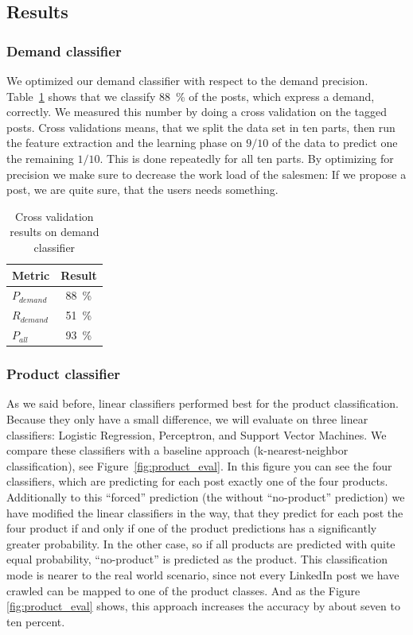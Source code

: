 \subsection{Results}
\label{sub:results}

\subsubsection{Demand classifier}
\label{ssub:demand_classifier}

We optimized our demand classifier with respect to the demand precision.
Table~\ref{table:demand_evaluation} shows that we classify 88~\% of the posts, which express a demand, correctly.
We measured this number by doing a cross validation on the tagged posts.
Cross validations means, that we split the data set in ten parts, then run the feature extraction and the learning phase on $9 / 10$ of the data to predict one the remaining $1 / 10$.
This is done repeatedly for all ten parts.
By optimizing for precision we make sure to decrease the work load of the salesmen: If we propose a post, we are quite sure, that the users needs something.

\begin{table}[h]
	\centering
	\begin{tabular}{lc}
		\hline
		\textbf{Metric} & \textbf{Result}  \\
		\hline
		\hline
		$P_{demand}$ & 88~\% \\
		\hline
		$R_{demand}$ & 51~\%  \\
		\hline
		$P_{all}$ & 93~\%  \\
		\hline
	\end{tabular}
	\caption{Cross validation results on demand classifier}
	\label{table:demand_evaluation}
\end{table}

\subsubsection{Product classifier}
\label{ssub:product_classifier}

As we said before, linear classifiers performed best for the product classification.
Because they only have a small difference, we will evaluate on three linear classifiers: Logistic Regression, Perceptron, and Support Vector Machines.
We compare these classifiers with a baseline approach (k-nearest-neighbor classification), see Figure~\ref{fig:product_eval}.
In this figure you can see the four classifiers, which are predicting for each post exactly one of the four products.
Additionally to this ``forced'' prediction (the without ``no-product'' prediction) we have modified the linear classifiers in the way, that they predict for each post the four product if and only if one of the product predictions has a significantly greater probability.
In the other case, so if all products are predicted with quite equal probability, ``no-product'' is predicted as the product.
This classification mode is nearer to the real world scenario, since not every LinkedIn post we have crawled can be mapped to one of the product classes.
And as the Figure \ref{fig:product_eval} shows, this approach increases the accuracy by about seven to ten percent.

